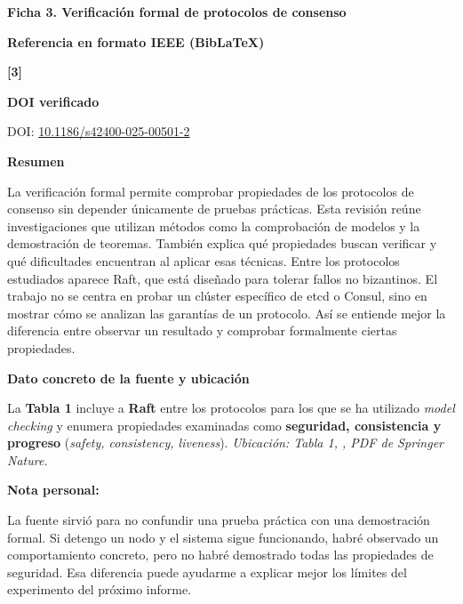 \documentclass[11pt,letterpaper]{article}
\newcommand{\ficha}[2]{\begin{center}\large\bfseries Ficha #1. #2\end{center}\vspace{0.4em}}
\newcommand{\campo}[1]{\par\vspace{0.45em}\noindent\textbf{#1}\par}
\begin{document}
\clearpage
\ficha{3}{Verificación formal de protocolos de consenso}
\campo{Referencia en formato IEEE (BibLaTeX)}
\textbf{[3]}\enspace {}
\campo{DOI verificado}
DOI: \href{https://doi.org/10.1186/s42400-025-00501-2}{10.1186/s42400-025-00501-2}
\campo{Resumen}
La verificación formal permite comprobar propiedades de los protocolos de consenso sin depender únicamente de pruebas prácticas. Esta revisión reúne investigaciones que utilizan métodos como la comprobación de modelos y la demostración de teoremas. También explica qué propiedades buscan verificar y qué dificultades encuentran al aplicar esas técnicas. Entre los protocolos estudiados aparece Raft, que está diseñado para tolerar fallos no bizantinos. El trabajo no se centra en probar un clúster específico de etcd o Consul, sino en mostrar cómo se analizan las garantías de un protocolo. Así se entiende mejor la diferencia entre observar un resultado y comprobar formalmente ciertas propiedades.
\campo{Dato concreto de la fuente y ubicación}
La \textbf{Tabla 1} incluye a \textbf{Raft} entre los protocolos para los que se ha utilizado \textit{model checking} y enumera propiedades examinadas como \textbf{seguridad, consistencia y progreso} (\textit{safety, consistency, liveness}). \textit{Ubicación: Tabla 1, \cite[p.~5]{feng2026verification}, PDF de Springer Nature.}
\campo{Nota personal: }
La fuente sirvió para no confundir una prueba práctica con una demostración formal. Si detengo un nodo y el sistema sigue funcionando, habré observado un comportamiento concreto, pero no habré demostrado todas las propiedades de seguridad. Esa diferencia puede ayudarme a explicar mejor los límites del experimento del próximo informe.
\end{document}
